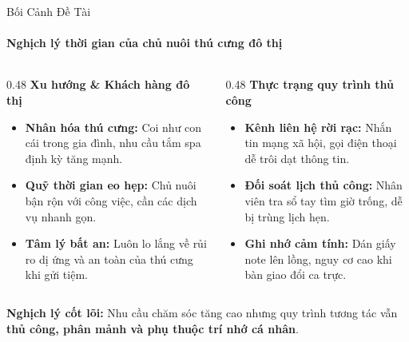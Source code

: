 \begin{frame}{Bối Cảnh Đề Tài}
  \framesubtitle{\color{white!90}\textbf{Nghịch lý thời gian của chủ nuôi thú cưng đô thị}}

  \begin{columns}[T]
    \begin{column}{0.48\textwidth}
      {\color{PetcarePrimary}\large \textbf{Xu hướng \& Khách hàng đô thị}}\\[2mm]
      \small
      \begin{itemize}
        \setlength\itemsep{2.8mm}
        \item \textbf{Nhân hóa thú cưng:} Coi như con cái trong gia đình, nhu cầu tắm spa định kỳ tăng mạnh.
        \item \textbf{Quỹ thời gian eo hẹp:} Chủ nuôi bận rộn với công việc, cần các dịch vụ nhanh gọn.
        \item \textbf{Tâm lý bất an:} Luôn lo lắng về rủi ro dị ứng và an toàn của thú cưng khi gửi tiệm.
      \end{itemize}
    \end{column}

    \begin{column}{0.48\textwidth}
      {\color{PetcarePrimary}\large \textbf{Thực trạng quy trình thủ công}}\\[2mm]
      \small
      \begin{itemize}
        \setlength\itemsep{2.8mm}
        \item \textbf{Kênh liên hệ rời rạc:} Nhắn tin mạng xã hội, gọi điện thoại dễ trôi dạt thông tin.
        \item \textbf{Đối soát lịch thủ công:} Nhân viên tra sổ tay tìm giờ trống, dễ bị trùng lịch hẹn.
        \item \textbf{Ghi nhớ cảm tính:} Dán giấy note lên lồng, nguy cơ cao khi bàn giao đổi ca trực.
      \end{itemize}
    \end{column}
  \end{columns}

  \vspace{4mm}
  \begin{center}
    \small
    \textbf{Nghịch lý cốt lõi:} Nhu cầu chăm sóc tăng cao nhưng quy trình tương tác vẫn \textbf{thủ công, phân mảnh và phụ thuộc trí nhớ cá nhân}.
  \end{center}
\end{frame}
